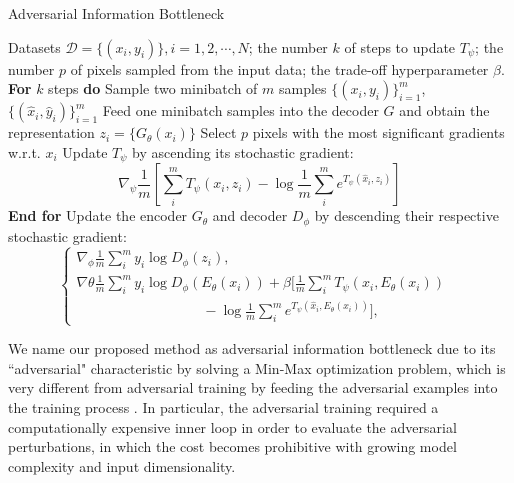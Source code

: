 \documentclass[10pt,journal,compsoc]{IEEEtran}
\begin{document}
\begin{algorithm}[htb]
\caption{Adversarial Information Bottleneck}    \label{alg:aib}
\begin{algorithmic}[1]
\Require  Datasets $\mathcal{D}=\{(x_i,y_i)\}, i=1,2,\cdots,N$; the number $k$ of steps to update $T_{\psi}$; the number $p$  of pixels sampled from the input data; the trade-off hyperparameter $\beta$.
\Ensure
\State \textbf{For} $k$ steps \textbf{do}
\State Sample two minibatch of $m$ samples $\{(x_i,y_i)\}_{i=1}^{m}$, $\{(\hat{x}_i,\hat{y}_i)\}_{i=1}^{m}$
\State Feed one minibatch samples into the decoder $G$ and obtain the representation $z_i = \{G_{\theta}(x_i)\}$
\State Select $p$ pixels with the most significant gradients w.r.t. $x_i$
\State Update $T_{\psi}$ by ascending its stochastic gradient:
\begin{equation*}
\nabla_{\psi} \frac{1}{m}\left[\sum_{i}^{m}T_{\psi}(x_i,z_i)-\log\frac{1}{m}\sum_{i}^{m}
e^{T_{\psi}(\hat{x}_{i},z_i)}\right]
\end{equation*}
\State \textbf{End for}
\State Update the encoder $G_{\theta}$ and decoder $D_{\phi}$ by descending  their respective stochastic gradient:
\begin{equation*}
\left\{
             \begin{array}{lr}
             \nabla_{\phi}\frac{1}{m}\sum_{i}^{m} y_{i} \log D_{\phi}(z_i), &  \\
             \nabla{\theta} \frac{1}{m}\sum_{i}^{m} y_{i} \log D_{\phi}(E_{\theta}(x_i)) + \beta[\frac{1}{m}\sum_{i}^{m}T_{\psi}(x_i,E_{\theta}(x_i))\\ \quad \quad \quad \quad \quad \quad \quad \quad \quad -\log \frac{1}{m}\sum_{i}^{m}e^{T_{\psi}(\hat{x}_{i},E_{\theta}(x_i))}], &
             \end{array}
\right.
\end{equation*}
\Output
\end{algorithmic}
\end{algorithm}

We name our proposed method as adversarial information bottleneck due to its ``adversarial" characteristic by solving a Min-Max optimization problem, which is very different from adversarial training by feeding the adversarial examples into the training process \cite{Goodfellow2015ExplainingAH}. In particular, the adversarial training required a computationally expensive inner loop in order to evaluate the adversarial perturbations, in which the cost becomes prohibitive with growing model complexity and input dimensionality.
\end{document}
